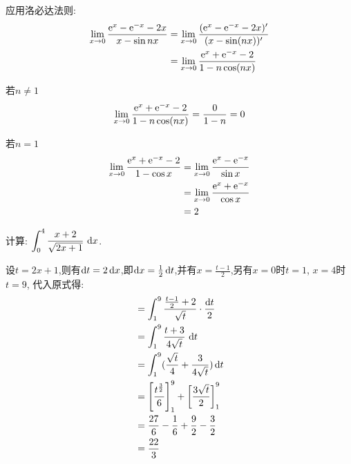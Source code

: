 \begin{questions}
	\begin{solution}
		应用洛必达法则:
		\begin{align*}
			\lim_{x\to0}\frac{\mathrm{e}^x - \mathrm{e}^{-x} - 2x}{x - \sin{nx}}
			 & = \lim_{x\to0}\frac{(\mathrm{e}^x - \mathrm{e}^{-x} - 2x)'}{(x - \sin(nx))'} \\
			 & = \lim_{x\to0}\frac{\mathrm{e}^x + \mathrm{e}^{-x} - 2}{1 - n\cos(nx)}
		\end{align*}
		\begin{penum}
			\item 若$n\neq1$
			      \begin{equation*}
				      \lim_{x\to0}\frac{\mathrm{e}^x+\mathrm{e}^{-x} - 2}{1-n\cos(nx)} = \frac{0}{1-n} = 0
			      \end{equation*}
			\item 若$n=1$
			      \begin{align*}
				      \lim_{x\to0}\frac{\mathrm{e}^x+\mathrm{e}^{-x} - 2}{1-\cos{x}} & = \lim_{x\to0}\frac{\mathrm{e}^x - \mathrm{e}^{-x}}{\sin{x}} \\
				                                                   & = \lim_{x\to0}\frac{\mathrm{e}^x + \mathrm{e}^{-x}}{\cos{x}} \\
				                                                   & = 2
			      \end{align*}
		\end{penum}
	\end{solution}

	\question 计算: $\displaystyle \int_0^4\frac{x+2}{\sqrt{2x+1}}\,\mathop{}\!\mathrm{d}x$.

	\begin{solution}
		设$t=2x+1$,则有$\mathop{}\!\mathrm{d}t = 2\mathop{}\!\mathrm{d}x$,即$\mathop{}\!\mathrm{d}x =
			\frac12\mathop{}\!\mathrm{d}t$,并有$x=\frac{t-1}2$,另有$x=0$时$t=1$, $x=4$时$t=9$,
		代入原式得:
		\begin{align*}
			 & = \int_1^9\frac{\frac{t-1}{2}+2}{\sqrt{t}}\cdot\frac{\mathop{}\!\mathrm{d}t}{2}            \\
			 & = \int_1^9\frac{t+3}{4\sqrt{t}}\,\mathop{}\!\mathrm{d}t                                    \\
			 & = \int_1^9(\frac{\sqrt{t}}{4} + \frac{3}{4\sqrt{t}})\mathop{}\!\mathrm{d}t                 \\
			 & = \left[\frac{t^{\frac32}}{6}\right]_1^9 + \left[\frac{3\sqrt{t}}{2}\right]_1^9 \\
			 & = \frac{27}{6} - \frac{1}{6} + \frac{9}{2} - \frac{3}{2}                        \\
			 & = \frac{22}{3}
		\end{align*}
	\end{solution}
\end{questions}
